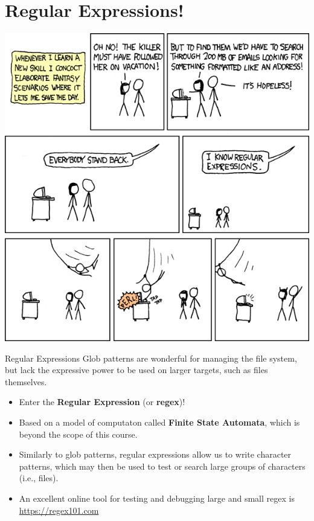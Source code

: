 \documentclass[11pt]{beamer}
\begin{document}
\section[Regex]{Regular Expressions!}
\begin{frame}
\center
\includegraphics[scale=0.32]{regular_expressions.png}
\end{frame}

\begin{frame}{Regular Expressions}
Glob patterns are wonderful for managing the file system, but lack the expressive power to be used on larger targets, such as files themselves.

\begin{itemize}
\item Enter the \textbf{Regular Expression} (or \textbf{regex})!
\item Based on a model of computaton called \textbf{Finite State Automata}, which is beyond the scope of this course.
\item Similarly to glob patterns, regular expressions allow us to write character patterns, which may then be used to test or search large groups of characters (i.e., files).
\item An excellent online tool for testing and debugging large and small regex is \url{https://regex101.com}
\end{itemize}
\end{frame}
\end{document}
